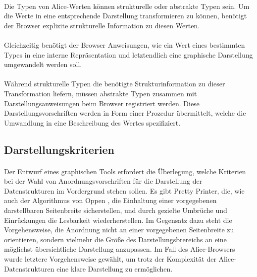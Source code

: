 \documentclass[12pt,a4paper]{article}
\begin{document}
\paragraph{}

Die Typen von Alice-Werten k\"onnen strukturelle oder abstrakte Typen 
sein. Um die Werte in eine entsprechende Darstellung transformieren 
zu k\"onnen, ben\"otigt der Browser explizite strukturelle  
Information zu diesen Werten. 

\paragraph{}

Gleichzeitig ben\"otigt der Browser Anweisungen, wie 
ein Wert eines bestimmten Types in eine interne 
Repr\"asentation und letztendlich eine graphische Darstellung 
umgewandelt werden soll.

\paragraph{}

W\"ahrend strukturelle Typen die ben\"otigte Strukturinformation 
zu dieser Transformation liefern, m\"ussen abstrakte Typen 
zusammen mit Darstellungsanweisungen beim Browser registriert 
werden. Diese Darstellungsvorschriften werden in Form einer 
Prozedur \"ubermittelt, welche die Umwandlung in eine 
Beschreibung des Wertes spezifiziert.  

\subsection{Darstellungskriterien}

\paragraph{}

Der Entwurf eines graphischen Tools erfordert die \"Uberlegung, 
welche Kriterien bei der Wahl von Anordnungsvorschriften f\"ur 
die Darstellung der Datenstrukturen im Vordergrund stehen sollen. 
Es gibt Pretty Printer, die, wie auch der 
Algorithmus von Oppen \cite{op:pr}, die Einhaltung einer vorgegebenen 
darstellbaren Seitenbreite sicherstellen, und durch gezielte 
Umbr\"uche und Einr\"uckungen die Lesbarkeit wiederherstellen. Im 
Gegensatz dazu steht die Vorgehensweise, die Anordnung nicht 
an einer vorgegebenen Seitenbreite zu orientieren, sondern 
vielmehr die Gr\"o\ss e des Darstellungsbrereichs an eine m\"oglichst 
\"ubersichtliche Darstellung anzupassen. 
Im Fall des Alice-Browsers wurde letztere Vorgehensweise gew\"ahlt, 
um trotz der Komplexit\"at der Alice-Datenstrukturen 
eine klare Darstellung zu erm\"oglichen.
\end{document}
